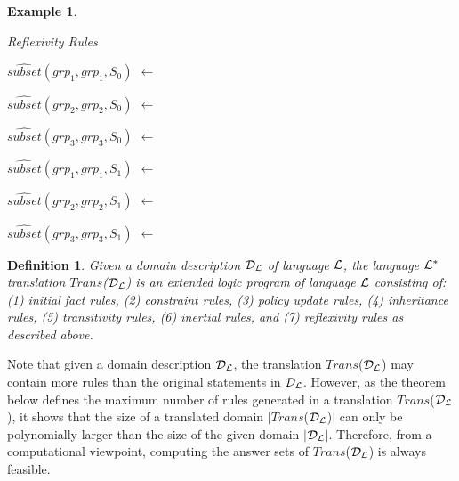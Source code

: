\documentclass[11pt]{report}
\newtheorem{vdefinition}{Definition}[chapter]
\newtheorem{vexample}{Example}[chapter]
\newenvironment{vquote}
{
  \begin{list}{}{\leftmargin 1em}\item[]
}
{
  \end{list}
}
\begin{document}
\begin{vexample}
\begin{enumerate}
            \item
              Reflexivity Rules

              \begin{vquote}
                $\hat{subset}(grp_1, grp_1, S_{0})$ $\leftarrow$

                $\hat{subset}(grp_2, grp_2, S_{0})$ $\leftarrow$

                $\hat{subset}(grp_3, grp_3, S_{0})$ $\leftarrow$

                $\hat{subset}(grp_1, grp_1, S_{1})$ $\leftarrow$

                $\hat{subset}(grp_2, grp_2, S_{1})$ $\leftarrow$

                $\hat{subset}(grp_3, grp_3, S_{1})$ $\leftarrow$
             \end{vquote}
          \end{enumerate}
        \end{vexample}

        \begin{vdefinition}
          \label{defn-langl-trans}
          Given a domain description ${\cal D_{L}}$ of language ${\cal L}$,
          the language ${\cal L^{*}}$ translation $Trans$(${\cal D_{L}}$)
          is an extended logic program of language ${\cal L}$ consisting of:
          (1) initial fact rules, (2) constraint rules, (3) policy update
          rules, (4) inheritance rules, (5) transitivity rules, (6) inertial
          rules, and (7) reflexivity rules as described above.
        \end{vdefinition}

        Note that given a domain description ${\cal D_{L}}$, the translation
        $Trans$(${\cal D_{L}}$) may contain more rules than the original
        statements in ${\cal D_{L}}$. However, as the theorem below defines
        the maximum number of rules generated in a translation
        $Trans$(${\cal D_{L}}$), it shows that the size of a translated
        domain $|$$Trans$(${\cal D_{L}}$)$|$ can only be polynomially larger
        than the size of the given domain $|$${\cal D_{L}}$$|$. Therefore,
        from a computational viewpoint, computing the answer sets of
        $Trans$(${\cal D_{L}}$) is always feasible.
\end{document}
